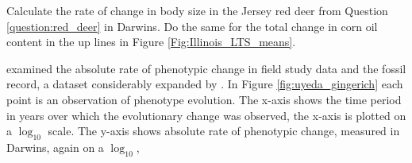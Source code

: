 \begin{question}
Calculate the rate of change in body size in the Jersey red deer from
Question \ref{question:red_deer} in Darwins. Do the same for the total
change in corn oil content in the up lines in Figure \ref{Fig:Illinois_LTS_means}.
  \end{question}

\citet{gingerich1983rates} examined the absolute rate of phenotypic
change in field study data and the fossil record, a dataset
considerably expanded by \citet{uyeda2011million}. In Figure
\ref{fig:uyeda_gingerich} each point is an observation of phenotype
evolution. The x-axis shows the time period in years over which the
evolutionary change was observed, the x-axis is plotted on a
$\log_{10}$ scale.  The y-axis shows absolute rate of phenotypic
change, measured in Darwins, again on a $\log_{10}$, 


